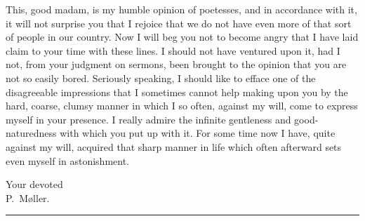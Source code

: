 \documentclass[12pt]{article}
\newcommand{\qvbreak}{\par\medskip\begin{center}\rule{0.32\textwidth}{0.4pt}\end{center}\medskip}
\begin{document}
This, good madam, is my humble opinion of poetesses, and in accordance with it, it
will not surprise you that I rejoice that we do not have even more of that sort of
people in our country. Now I will beg you not to become angry that I have laid claim
to your time with these lines. I should not have ventured upon it, had I not, from
your judgment on sermons, been brought to the opinion that you are not so easily
bored. Seriously speaking, I should like to efface one of the disagreeable
impressions that I sometimes cannot help making upon you by the hard, coarse,
clumsy manner in which I so often, against my will, come to express myself in your
presence. I really admire the infinite gentleness and good-naturedness with which
you put up with it. For some time now I have, quite against my will, acquired that
sharp manner in life which often afterward sets even myself in astonishment.

\begin{flushright}
Your devoted\\
P.~Møller.
\end{flushright}

\qvbreak
\end{document}
